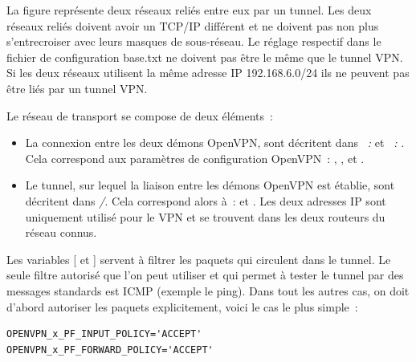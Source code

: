   \begin{description}

  \item [local net, remote net] La figure représente deux réseaux reliés entre eux par un
  tunnel. Les deux réseaux reliés doivent avoir un TCP/IP différent et ne doivent pas non plus
  s'entrecroiser avec leurs masques de sous-réseau. Le réglage respectif 
  dans le fichier de configuration base.txt ne doivent pas être le même que le
  tunnel VPN. Si les deux réseaux utilisent la même adresse IP 192.168.6.0/24
  ils ne peuvent pas être liés par un tunnel VPN.

  \item [transport net] Le réseau de transport se compose de deux éléments~:

  \begin{itemize}

  \item La connexion entre les deux démons OpenVPN, sont décritent dans
  \emph{~: } et
  \emph{~: }.
  Cela correspond aux paramètres de configuration OpenVPN~: ,
  ,  et
  .

  \item Le tunnel, sur lequel la liaison entre les démons OpenVPN est établie, sont décritent dans
  \emph{/}.
  Cela correspond alors à~:  et .
  Les deux adresses IP sont uniquement utilisé pour le VPN et se trouvent dans les deux
  routeurs du réseau connus.

  \end{itemize}

  \item Les variables [ et ]
  servent à filtrer les paquets qui circulent dans le tunnel. Le seule filtre
  autorisé que l'on peut utiliser et qui permet à tester le tunnel par des messages
  standards est ICMP (exemple le ping). Dans tout les autres cas, on doit
  d'abord autoriser les paquets explicitement, voici le cas le plus simple~:

\begin{example}
\begin{verbatim}
OPENVPN_x_PF_INPUT_POLICY='ACCEPT'
OPENVPN_x_PF_FORWARD_POLICY='ACCEPT'
\end{verbatim}
\end{example}


  \end{description}

